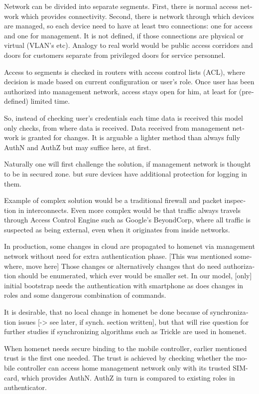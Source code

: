 \documentclass[12pt,a4paper,english]{tutthesis}
\begin{document}
\begin{otherlanguage}{english}
Network can be divided into separate segments. 
First, there is normal access network which provides
connectivity. Second, there is network through which devices are
managed, so each device need to have at least two connections: one for
access and one for management. It is not defined, if those connections
are physical or virtual (VLAN's etc). 
Analogy to real world would be public access corridors and doors for
customers separate from privileged doors for service personnel.

Access to segments is checked in routers with access control lists
(ACL), where decision is made based on current configuration or user's
role.  Once user has been authorized into management network, access
stays open for him, at least for (predefined) limited time.

So, instead of checking user's credentials each time data is received
this model only checks, from where data is received. 
Data received from management network is granted for changes.
It is arguable a lighter method than always
fully AuthN and AuthZ but may suffice here, at first.

Naturally one will first challenge the solution, if
management network is thought to be in secured zone.
but sure devices have additional protection for logging in them. 


Example of complex solution would be a traditional firewall and packet
inspection in interconnects. Even more complex would be that traffic
always travels through Access Control Engine such as Google's
BeyondCorp\cite{2014-beyondcorp}, where all
traffic is suspected as being external, even when it originates from inside networks.

In production, some changes in cloud are propagated to homenet via
management network without need for extra authentication phase.  [This
was mentioned somewhere, move here] Those changes or alternatively
changes that do need authorization should be enumerated, which ever
would be smaller set. In our model, [only] initial bootstrap needs the
authentication with smartphone as does changes in roles and some
dangerous combination of commands.

It is desirable, that no local change in homenet be done because of
synchronization issues [-> see later, if synch. section written],
but that will rise question for further studies if synchronizing algorithms such
as Trickle are used in homenet.




When homenet needs secure binding to the mobile controller, earlier
mentioned trust is the first one needed.  The trust is achieved by
checking whether the mobile controller can access home management
network only with its trusted SIM-card, which provides AuthN. AuthZ in
turn is compared to existing roles in authenticator.



\end{otherlanguage}
\end{document}

